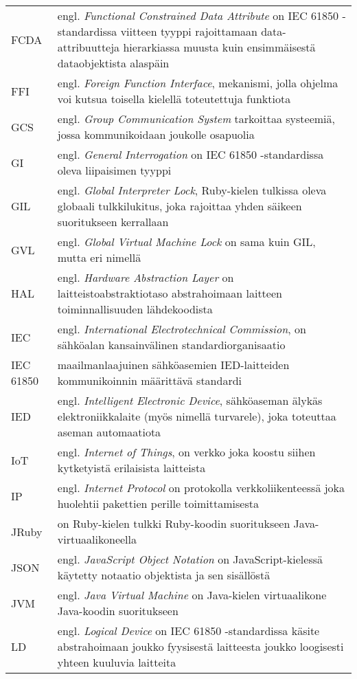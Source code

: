 \begin{tabularx}{\linewidth}[h]{@{} p{} p{} @{}}
	FCDA & engl. \emph{Functional Constrained Data Attribute} on IEC 61850 -standardissa viitteen tyyppi rajoittamaan data-attribuutteja hierarkiassa muusta kuin ensimmäisestä dataobjektista alaspäin \\
	FFI & engl. \emph{Foreign Function Interface}, mekanismi, jolla ohjelma voi kutsua toisella kielellä toteutettuja funktiota \\
	GCS & engl. \emph{Group Communication System} tarkoittaa systeemiä, jossa kommunikoidaan joukolle osapuolia \\
	GI & engl. \emph{General Interrogation} on IEC 61850 -standardissa oleva liipaisimen tyyppi \\
	GIL & engl. \emph{Global Interpreter Lock}, Ruby-kielen tulkissa oleva globaali tulkkilukitus, joka rajoittaa yhden säikeen suoritukseen kerrallaan \\
	GVL & engl. \emph{Global Virtual Machine Lock} on sama kuin GIL, mutta eri nimellä \\
	HAL & engl. \emph{Hardware Abstraction Layer} on laitteistoabstraktiotaso abstrahoimaan laitteen toiminnallisuuden lähdekoodista \\
	IEC & engl. \emph{International Electrotechnical Commission}, on sähköalan kansainvälinen standardiorganisaatio \\
	IEC 61850 & maailmanlaajuinen sähköasemien IED-laitteiden kommunikoinnin määrittävä standardi \\
	IED & engl. \emph{Intelligent Electronic Device}, sähköaseman älykäs elektroniikkalaite (myös nimellä turvarele), joka toteuttaa aseman automaatiota \\
	IoT & engl. \emph{Internet of Things}, on verkko joka koostu siihen kytketyistä erilaisista laitteista \\
	IP & engl. \emph{Internet Protocol} on protokolla verkkoliikenteessä joka huolehtii pakettien perille toimittamisesta \\
	JRuby & on Ruby-kielen tulkki Ruby-koodin suoritukseen Java-virtuaalikoneella \\
	JSON & engl. \emph{JavaScript Object Notation} on JavaScript-kielessä käytetty notaatio objektista ja sen sisällöstä \\
	JVM & engl. \emph{Java Virtual Machine} on Java-kielen virtuaalikone Java-koodin suoritukseen \\
	LD & engl. \emph{Logical Device} on IEC 61850 -standardissa käsite abstrahoimaan joukko fyysisestä laitteesta joukko loogisesti yhteen kuuluvia laitteita \\

\end{tabularx}
